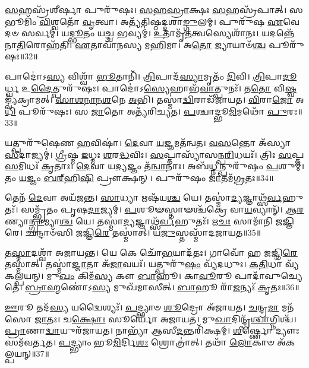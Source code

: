 \-\ul{𑌸}\-𑌹𑌸𑍍𑌰᳴𑌶𑍀𑌰𑍍\mbox{}\-\ul{𑌷𑌾} 𑌪𑍁𑌰𑍁᳴𑌷𑌃। 
\-\ul{𑌸}\-\-\ul{𑌹}\-\-\ul{𑌸𑍍𑌰𑌾}\-𑌕𑍍𑌷𑌃 \ul{𑌸}\-𑌹𑌸𑍍𑌰᳴𑌪𑌾𑌤𑍍। 
𑌸 𑌭𑍂𑌮𑌿𑌂᳴ \ul{𑌵𑌿}\-𑌶𑍍𑌵𑌤𑍋᳴ \ul{𑌵𑍃}\-𑌤𑍍𑌵𑌾। 
𑌅𑌤𑍍𑌯᳴𑌤𑌿𑌷𑍍𑌠𑌦𑍍𑌦𑌶𑌾\-\ul{𑌙𑍍𑌗𑍁}\-𑌲𑌮𑍍। 
𑌪𑍁𑌰𑍁᳴𑌷 \ul{𑌏}\-𑌵𑍇𑌦𑍞 𑌸𑌰𑍍𑌵𑌮𑍍॑। 
𑌯\-\ul{𑌦𑍍𑌭𑍂}\-𑌤𑌂 𑌯\-\ul{𑌚𑍍𑌚} 𑌭𑌵𑍍𑌯𑌮𑍍॑। 
\-\ul{𑌉}\-𑌤𑌾𑌮𑍃᳴\-\ul{𑌤}\-𑌤𑍍𑌵𑌸𑍍𑌯𑍇𑌶𑌾᳴𑌨𑌃। 
𑌯𑌦𑌨𑍍𑌨𑍇᳴𑌨𑌾\-\ul{𑌤𑌿}\-𑌰𑍋𑌹᳴𑌤𑌿। 
\-\ul{𑌏}\-𑌤𑌾𑌵𑌾᳴𑌨𑌸𑍍𑌯 𑌮\-\ul{𑌹𑌿}\-𑌮𑌾। 
𑌅\-\ul{𑌤𑍋} 𑌜𑍍𑌯𑌾𑌯𑌾𑍞᳴\-\ul{𑌶𑍍𑌚} 𑌪𑍂𑌰𑍁᳴𑌷𑌃॥32॥

𑌪𑌾𑌦𑍋॑𑌽\-\ul{𑌸𑍍𑌯} 𑌵𑌿𑌶𑍍𑌵𑌾᳴ \ul{𑌭𑍂}\-𑌤𑌾𑌨𑌿᳴। 
\-\ul{𑌤𑍍𑌰𑌿}\-𑌪𑌾𑌦᳴\-\ul{𑌸𑍍𑌯𑌾}\-𑌮𑍃𑌤𑌂᳴ \ul{𑌦𑌿}\-𑌵𑌿। 
\-\ul{𑌤𑍍𑌰𑌿}\-𑌪𑌾\-\ul{𑌦𑍂}\-𑌰𑍍𑌧𑍍𑌵 𑌉\-\ul{𑌦𑍈}\-𑌤𑍍𑌪𑍁𑌰𑍁᳴𑌷𑌃। 
𑌪𑌾𑌦𑍋॑𑌽\-\ul{𑌸𑍍𑌯𑍇}\-𑌹𑌾𑌭᳴\-\ul{𑌵𑌾}\-𑌤𑍍𑌪𑍁𑌨𑌃᳴। 
𑌤\-\ul{𑌤𑍋} 𑌵𑌿\-\ul{𑌷𑍍𑌵}\-𑌙𑍍𑌵𑍍𑌯᳴𑌕𑍍𑌰𑌾𑌮𑌤𑍍। 
\-\ul{𑌸𑌾}\-\-\ul{𑌶}\-\-\ul{𑌨𑌾}\-\-\ul{𑌨}\-\-\ul{𑌶}\-𑌨𑍇 \ul{𑌅}\-𑌭𑌿। 
𑌤𑌸𑍍𑌮𑌾॑\-\ul{𑌦𑍍𑌵𑌿}\-𑌰𑌾𑌡᳴𑌜𑌾𑌯𑌤। 
\-\ul{𑌵𑌿}\-𑌰𑌾\-\ul{𑌜𑍋} 𑌅\-\ul{𑌧𑌿} 𑌪𑍂𑌰𑍁᳴𑌷𑌃। 
𑌸 \ul{𑌜𑌾}\-𑌤𑍋 𑌅𑌤𑍍𑌯᳴𑌰𑌿𑌚𑍍𑌯𑌤। 
\-\ul{𑌪}\-𑌶𑍍𑌚𑌾𑌦𑍍𑌭𑍂\-\ul{𑌮𑌿}\-𑌮𑌥𑍋᳴ \ul{𑌪𑍁}\-𑌰𑌃॥33॥

𑌯𑌤𑍍𑌪𑍁𑌰𑍁᳴𑌷𑍇𑌣 \ul{𑌹}\-𑌵𑌿𑌷𑌾॑। 
\-\ul{𑌦𑍇}\-𑌵𑌾 \ul{𑌯}\-𑌜𑍍𑌞𑌮𑌤᳴𑌨𑍍𑌵𑌤। 
\-\ul{𑌵}\-\-\ul{𑌸}\-𑌨𑍍𑌤𑍋 𑌅᳴𑌸𑍍𑌯𑌾\-\ul{𑌸𑍀}\-\-𑌦𑌾𑌜𑍍𑌯𑌮𑍍॑। 
\-\ul{𑌗𑍍𑌰𑍀}\-𑌷𑍍𑌮 \ul{𑌇}\-𑌧𑍍𑌮𑌃  \ul{𑌶}\-𑌰\-\ul{𑌦𑍍𑌧}\-𑌵𑌿𑌃। 
\-\ul{𑌸}\-𑌪𑍍𑌤𑌾𑌸𑍍𑌯𑌾᳴𑌸𑌨𑍍𑌪\-\ul{𑌰𑌿}\-\-𑌧𑌯𑌃᳴। 
𑌤𑍍𑌰𑌿𑌃 \ul{𑌸}\-𑌪𑍍𑌤 \ul{𑌸}\-𑌮𑌿𑌧𑌃᳴ \ul{𑌕𑍃}\-𑌤𑌾𑌃। 
\-\ul{𑌦𑍇}\-𑌵𑌾 𑌯\-\ul{𑌦𑍍𑌯}\-𑌜𑍍𑌞𑌂 𑌤᳴\-\ul{𑌨𑍍𑌵𑌾}\-𑌨𑌾𑌃। 
𑌅𑌬᳴\-\ul{𑌧𑍍𑌨}\-𑌨𑍍𑌪𑍁𑌰𑍁᳴𑌷𑌂 \ul{𑌪}\-𑌶𑍁𑌮𑍍। 
𑌤𑌂 \ul{𑌯}\-𑌜𑍍𑌞𑌂 \ul{𑌬}\-\-\ul{𑌰𑍍}\-‌𑌹𑌿\-\ul{𑌷𑌿} 𑌪𑍍𑌰𑍗𑌕𑍍𑌷𑌨𑍍। 
𑌪𑍁𑌰𑍁᳴𑌷𑌂 \ul{𑌜𑌾}\-𑌤𑌮᳴\-\ul{𑌗𑍍𑌰}\-𑌤𑌃॥34॥

𑌤𑍇𑌨᳴ \ul{𑌦𑍇}\-𑌵𑌾 𑌅𑌯᳴𑌜𑌨𑍍𑌤। 
\-\ul{𑌸𑌾}\-𑌧𑍍𑌯𑌾 𑌋𑌷᳴𑌯\-\ul{𑌶𑍍𑌚} 𑌯𑍇। 
𑌤𑌸𑍍𑌮𑌾॑\-\ul{𑌦𑍍𑌯}\-𑌜𑍍𑌞𑌾𑌥𑍍𑌸᳴\-\ul{𑌰𑍍𑌵}\-𑌹𑍁𑌤𑌃᳴। 
𑌸𑌮𑍍𑌭𑍃᳴𑌤𑌂 𑌪𑍃𑌷\-\ul{𑌦𑌾}\-𑌜𑍍𑌯𑌮𑍍। 
\-\ul{𑌪}\-𑌶𑍂𑍟𑌸𑍍𑌤𑌾𑍟𑌶𑍍𑌚᳴𑌕𑍍𑌰𑍇 𑌵𑌾\-\ul{𑌯}\-𑌵𑍍𑌯𑌾𑌨𑍍᳴। 
\-\ul{𑌆}\-\-\ul{𑌰}\-𑌣𑍍𑌯𑌾\-\ul{𑌨𑍍𑌗𑍍𑌰𑌾}\-𑌮𑍍𑌯𑌾\-\ul{𑌶𑍍𑌚} 𑌯𑍇। 
𑌤𑌸𑍍𑌮𑌾॑\-\ul{𑌦𑍍𑌯}\-𑌜𑍍𑌞𑌾𑌥𑍍𑌸᳴\-\ul{𑌰𑍍𑌵}\-𑌹𑍁𑌤𑌃᳴। 
𑌋\-\ul{𑌚𑌃} 𑌸𑌾𑌮𑌾᳴𑌨𑌿 𑌜𑌜𑍍𑌞𑌿𑌰𑍇। 
𑌛𑌨𑍍𑌦𑌾𑍞᳴𑌸𑌿 𑌜𑌜𑍍𑌞𑌿\-\ul{𑌰𑍇} 𑌤𑌸𑍍𑌮𑌾॑𑌤𑍍। 
𑌯\-\ul{𑌜𑍁}\-𑌸𑍍𑌤𑌸𑍍𑌮𑌾᳴𑌦𑌜𑌾𑌯𑌤॥35॥

𑌤\-\ul{𑌸𑍍𑌮𑌾}\-𑌦𑌶𑍍𑌵𑌾᳴ 𑌅𑌜𑌾𑌯𑌨𑍍𑌤। 
𑌯𑍇 𑌕𑍇 𑌚𑍋᳴\-\ul{𑌭}\-𑌯𑌾𑌦᳴𑌤𑌃। 
𑌗𑌾𑌵𑍋᳴ 𑌹 𑌜𑌜𑍍𑌞𑌿\-\ul{𑌰𑍇} 𑌤𑌸𑍍𑌮𑌾॑𑌤𑍍। 
𑌤𑌸𑍍𑌮𑌾॑\-\ul{𑌜𑍍𑌜𑌾}\-𑌤𑌾 𑌅᳴\-\ul{𑌜𑌾}\-𑌵𑌯𑌃᳴। 
𑌯𑌤𑍍𑌪𑍁𑌰𑍁᳴\-\ul{𑌷𑌂} 𑌵𑍍𑌯᳴𑌦𑌧𑍁𑌃। 
\-\ul{𑌕}\-\-\ul{𑌤𑌿}\-𑌧𑌾 𑌵𑍍𑌯᳴𑌕𑌲𑍍𑌪𑌯𑌨𑍍। 
𑌮𑍁\-\ul{𑌖𑌂} 𑌕𑌿𑌮᳴\-\ul{𑌸𑍍𑌯} 𑌕𑍗 \ul{𑌬𑌾}\-𑌹𑍂। 
𑌕𑌾\-\ul{𑌵𑍂}\-𑌰𑍂 𑌪𑌾𑌦𑌾᳴𑌵𑍁𑌚𑍍𑌯𑍇𑌤𑍇। 
\-\ul{𑌬𑍍𑌰𑌾}\-\-\ul{𑌹𑍍𑌮}\-𑌣𑍋॑𑌽\-\ul{𑌸𑍍𑌯} 𑌮𑍁𑌖᳴𑌮𑌾𑌸𑍀𑌤𑍍। 
\-\ul{𑌬𑌾}\-𑌹𑍂 𑌰𑌾᳴\-\ul{𑌜}\-𑌨𑍍𑌯𑌃᳴ \ul{𑌕𑍃}\-𑌤𑌃॥36॥

\-\ul{𑌊}\-𑌰𑍂 𑌤𑌦᳴\-\ul{𑌸𑍍𑌯} 𑌯𑌦𑍍𑌵𑍈𑌶𑍍𑌯𑌃᳴। 
\-\ul{𑌪}\-𑌦𑍍𑌭𑍍𑌯𑌾𑍞 \ul{𑌶𑍂}\-𑌦𑍍𑌰𑍋 𑌅᳴𑌜𑌾𑌯𑌤। 
\-\ul{𑌚}\-𑌨𑍍𑌦𑍍𑌰\-\ul{𑌮𑌾} 𑌮𑌨᳴𑌸𑍋 \ul{𑌜𑌾}\-𑌤𑌃। 
𑌚\-\ul{𑌕𑍍𑌷𑍋𑌃} 𑌸𑍂𑌰𑍍𑌯𑍋᳴ 𑌅𑌜𑌾𑌯𑌤। 
𑌮𑍁\-\ul{𑌖𑌾}\-𑌦𑌿𑌨𑍍𑌦𑍍𑌰᳴\-\ul{𑌶𑍍𑌚𑌾}\-𑌗𑍍𑌨𑌿𑌶𑍍𑌚᳴। 
\-\ul{𑌪𑍍𑌰𑌾}\-𑌣𑌾\-\ul{𑌦𑍍𑌵𑌾}\-𑌯𑍁𑌰᳴𑌜𑌾𑌯𑌤। 
𑌨𑌾𑌭𑍍𑌯𑌾᳴ 𑌆𑌸𑍀\-\ul{𑌦}\-𑌨𑍍𑌤𑌰𑌿᳴𑌕𑍍𑌷𑌮𑍍। 
\-\ul{𑌶𑍀}\-𑌰𑍍𑌷𑍍𑌣𑍋 𑌦𑍍𑌯𑍗𑌃 𑌸𑌮᳴𑌵𑌰𑍍𑌤𑌤। 
\-\ul{𑌪}\-𑌦𑍍𑌭𑍍𑌯𑌾𑌂 𑌭𑍂\-\ul{𑌮𑌿}\-𑌰𑍍𑌦𑌿\-\ul{𑌶𑌃} 𑌶𑍍𑌰𑍋𑌤𑍍𑌰𑌾॑𑌤𑍍। 
𑌤𑌥𑌾᳴ \ul{𑌲𑍋}\-𑌕𑌾𑍞 𑌅᳴𑌕𑌲𑍍𑌪𑌯𑌨𑍍॥37॥

